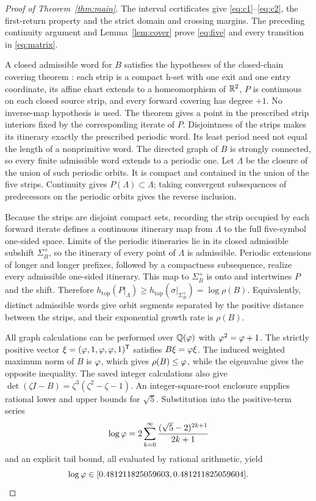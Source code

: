\begin{proof}[Proof of Theorem~\ref{thm:main}]
The interval certificates give \eqref{eq:c1}--\eqref{eq:c2}, the first-return
property and the strict domain and crossing margins. The preceding
continuity argument and Lemma~\ref{lem:cover} prove \eqref{eq:five} and every
transition in \eqref{eq:matrix}.

A closed admissible word for $B$ satisfies the hypotheses of the
closed-chain covering theorem \cite[Theorem 9]{ZG}: each strip is a compact
h-set with one exit and one entry coordinate, its affine chart extends to a
homeomorphism of $\mathbb R^2$, $P$ is continuous on each closed source strip, and
every forward covering has degree $+1$. No inverse-map hypothesis is used.
The theorem gives a point in the prescribed strip interiors fixed by the
corresponding iterate of $P$. Disjointness of the strips makes its itinerary
exactly the prescribed periodic word. Its least period need not equal the
length of a nonprimitive word. The directed graph of
$B$ is strongly connected, so every finite admissible word extends to a
periodic one. Let $\Lambda$ be the closure of the union of such periodic
orbits. It is compact and contained in the union of the five strips.
Continuity gives $P(\Lambda)\subset\Lambda$; taking convergent subsequences of
predecessors on the periodic orbits gives the reverse inclusion.

Because the strips are disjoint compact sets, recording the strip occupied
by each forward iterate defines a continuous itinerary map from $\Lambda$
to the full five-symbol one-sided space. Limits of the periodic itineraries
lie in its closed admissible subshift $\Sigma_B^+$, so the itinerary of every
point of $\Lambda$ is admissible. Periodic extensions of longer and longer
prefixes, followed by a compactness subsequence, realize every admissible
one-sided itinerary. This map to $\Sigma_B^+$ is onto
and intertwines $P$ and the shift. Therefore
$h_{\mathrm{top}}(P|_\Lambda)\geq h_{\mathrm{top}}(\sigma|_{\Sigma_B^+})
=\log\rho(B)$. Equivalently, distinct admissible words give orbit segments
separated by the positive distance between the strips, and their exponential
growth rate is $\rho(B)$.

All graph calculations can be performed over $\mathbb Q(\varphi)$ with
$\varphi^2=\varphi+1$. The strictly positive vector
$\xi=(\varphi,1,\varphi,\varphi,1)^{\mathsf T}$ satisfies $B\xi=\varphi\xi$.
The induced weighted maximum norm of $B$ is $\varphi$, which gives
$\rho(B)\leq\varphi$, while the eigenvalue gives the opposite inequality.
The saved integer calculations also give
$\det(\zeta I-B)=\zeta^3(\zeta^2-\zeta-1)$.
An integer-square-root enclosure supplies rational lower and upper bounds
for $\sqrt5$. Substitution into the positive-term series
\[
 \log\varphi=2\sum_{k=0}^{\infty}
       \frac{(\sqrt5-2)^{2k+1}}{2k+1}
\]
and an explicit tail bound, all evaluated by rational arithmetic, yield
\[
 \log\varphi\in[0.481211825059603,0.481211825059604].
\]
\end{proof}

